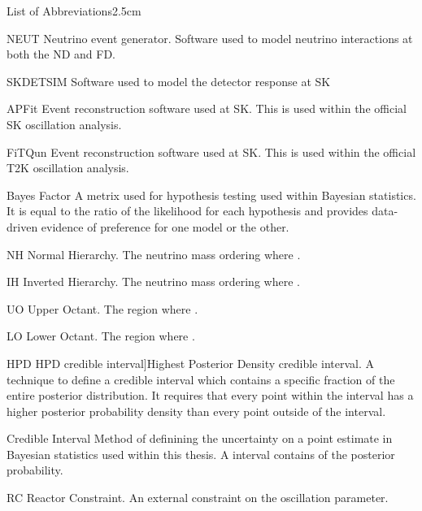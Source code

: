 \begin{mclistof}{List of Abbreviations}{2.5cm}
\item[NEUT]Neutrino event generator. Software used to model neutrino interactions at both the ND and FD.
\item[SKDETSIM]Software used to model the detector response at SK
\item[APFit]Event reconstruction software used at SK. This is used within the official SK oscillation analysis.
\item[FiTQun]Event reconstruction software used at SK. This is used within the official T2K oscillation analysis.

\item[Bayes Factor]A metrix used for hypothesis testing used within Bayesian statistics. It is equal to the ratio of the likelihood for each hypothesis and provides data-driven evidence of preference for one model or the other.
\item[NH]Normal Hierarchy. The neutrino mass ordering where .
\item[IH]Inverted Hierarchy. The neutrino mass ordering where .
\item[UO]Upper Octant. The region where .
\item[LO]Lower Octant. The region where .

\item[HPD]HPD credible interval]Highest Posterior Density credible interval. A technique to define a credible interval which contains a specific fraction of the entire posterior distribution. It requires that every point within the interval has a higher posterior probability density than every point outside of the interval.
\item[Credible Interval]Method of definining the uncertainty on a point estimate in Bayesian statistics used within this thesis. A  interval contains  of the posterior probability.
\item[RC]Reactor Constraint. An external constraint on the  oscillation parameter.


\end{mclistof}
